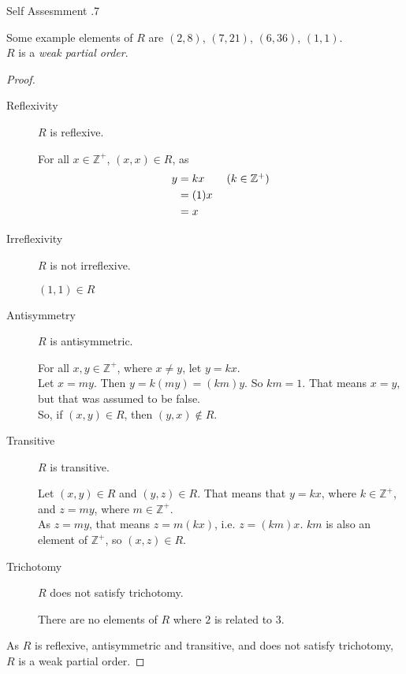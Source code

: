 \documentclass[../notes.tex]{subfiles}
\begin{document}
\begin{exercise}{Self Assesmment \thechapter.7}
\begin{enumerate}
							Some example elements of $R$ are $(2, 8)$, $(7, 21)$, $(6, 36)$, $(1, 1)$.\\
							$R$ is a \emph{weak partial order}.
							\begin{proof}
								$ $
								\begin{description}
									\item[Reflexivity] $R$ is reflexive.
										\begin{subproof}
											For all $x \in \mathbb{Z}^{+}$, $(x, x) \in R$, as
											\begin{align*}
												y &= kx \tag*{$(k \in \mathbb{Z}^{+})$}\\
												&= (1)x\\
												&= x
											\end{align*}
										\end{subproof}
									\item[Irreflexivity] $R$ is not irreflexive.
										\begin{subproof}[Counterexample]
											$(1, 1) \in R$
										\end{subproof}
									\item[Antisymmetry] $R$ is antisymmetric.
										\begin{subproof}
											For all $x, y \in \mathbb{Z}^{+}$, where $x \neq y$, let $y = kx$.\\
											Let $x = my$. Then $y = k(my) = (km)y$. So $km = 1$. That means $x = y$, but that was assumed to be false.\\
											So, if $(x, y) \in R$, then $(y, x) \notin R$.
										\end{subproof}
									\item[Transitive] $R$ is transitive.
										\begin{subproof}
											Let $(x, y) \in R$ and $(y, z) \in R$. That means that $y = kx$, where $k \in \mathbb{Z}^{+}$, and $z = my$, where $m \in \mathbb{Z}^{+}$.\\
											As $z = my$, that means $z = m(kx)$, i.e. $z = (km)x$. $km$ is also an element of $\mathbb{Z}^{+}$, so $(x, z) \in R$.
										\end{subproof}
									\item[Trichotomy] $R$ does not satisfy trichotomy.
										\begin{subproof}[Counterexample]
											There are no elements of $R$ where $2$ is related to $3$.
										\end{subproof}
								\end{description}
								As $R$ is reflexive, antisymmetric and transitive, and does not satisfy trichotomy, $R$ is a weak partial order.
							\end{proof}
					\end{enumerate}
				\end{exercise}
		\pagebreak
\end{document}
